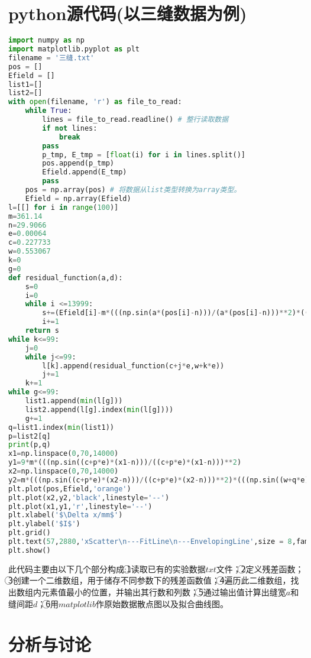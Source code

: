 \documentclass[a4 paper,12pt]{article}
\begin{document}
\section{python源代码(以三缝数据为例)}
\begin{lstlisting}[language=python]
import numpy as np
import matplotlib.pyplot as plt
filename = '三缝.txt'
pos = []
Efield = []
list1=[]
list2=[]
with open(filename, 'r') as file_to_read:
    while True:
        lines = file_to_read.readline() # 整行读取数据
        if not lines:
            break
        pass
        p_tmp, E_tmp = [float(i) for i in lines.split()] 
        pos.append(p_tmp)  
        Efield.append(E_tmp)
        pass
    pos = np.array(pos) # 将数据从list类型转换为array类型。
    Efield = np.array(Efield)
l=[[] for i in range(100)]
m=361.14
n=29.9066
e=0.00064
c=0.227733
w=0.553067
k=0
g=0
def residual_function(a,d):
    s=0
    i=0
    while i <=13999:
        s+=(Efield[i]-m*(((np.sin(a*(pos[i]-n)))/(a*(pos[i]-n)))**2)*(((np.sin(d*3*(pos[i]-n)))/(np.sin(d*(pos[i]-n))))**2))**2
        i+=1
    return s
while k<=99:
    j=0
    while j<=99:
        l[k].append(residual_function(c+j*e,w+k*e))
        j+=1
    k+=1
while g<=99:
    list1.append(min(l[g]))
    list2.append(l[g].index(min(l[g])))
    g+=1
q=list1.index(min(list1))
p=list2[q]
print(p,q)
x1=np.linspace(0,70,14000)
y1=9*m*(((np.sin((c+p*e)*(x1-n)))/((c+p*e)*(x1-n)))**2)
x2=np.linspace(0,70,14000)
y2=m*(((np.sin((c+p*e)*(x2-n)))/((c+p*e)*(x2-n)))**2)*(((np.sin((w+q*e)*3*(x2-n)))/(np.sin((w+q*e)*(x2-n))))**2)
plt.plot(pos,Efield,'orange')
plt.plot(x2,y2,'black',linestyle='--')
plt.plot(x1,y1,'r',linestyle='--')
plt.xlabel('$\Delta x/mm$')
plt.ylabel('$I$')
plt.grid()
plt.text(57,2880,'xScatter\n---FitLine\n---EnvelopingLine',size = 8,family = "fantasy",style = "italic",bbox = dict(alpha = 0.2))
plt.show()      
\end{lstlisting}
此代码主要由以下几个部分构成:\textcircled{1}读取已有的实验数据$txt$文件；\textcircled{2}定义残差函数；\textcircled{3}创建一个二维数组，用于储存不同参数下的残差函数值；\textcircled{4}遍历此二维数组，找出数组内元素值最小的位置，并输出其行数和列数；\textcircled{5}通过输出值计算出缝宽$a$和缝间距$d$；\textcircled{6}用$matplotlib$作原始数据散点图以及拟合曲线图。
\section{分析与讨论}
\end{document}
